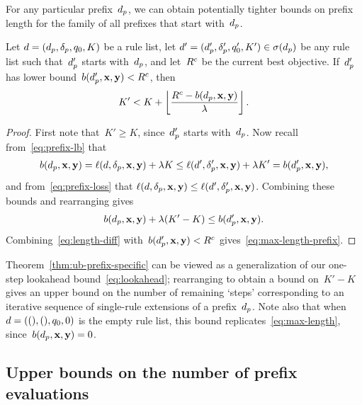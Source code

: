 For any particular prefix~$d_p$, we can obtain potentially tighter bounds on
prefix length for the family of all prefixes that start with~$d_p$.

\begin{theorem}
\label{thm:ub-prefix-specific}
Let ${{d} = (d_p, \delta_p, q_0, K)}$ be a rule list, let
${{d}' = (d_p', \delta_p', q_0', K') \in \sigma(d_p)}$
be any rule list such that~$d_p'$ starts with~$d_p$,
and let~${R^c}$ be the current best objective.
%
If~$d_p'$ has lower bound~${b(d_p', \mathbf{x}, \mathbf{y}) < {R^c}}$, then
\begin{align}
K' < K + \left\lfloor \frac{\CurrentObj - b(\Prefix, \x, \y)}{\Reg} \right\rfloor.
\label{eq:max-length-prefix}
\end{align}
\end{theorem}

\begin{proof}
First note that~${K' \ge K}$, since~$d_p'$ starts with~$d_p$.
%
Now recall from~\eqref{eq:prefix-lb} that
%
\begin{align}
b(\Prefix, \x, \y) = \Loss(\RL, \Labels, \x, \y) + \Reg K
\le \Loss(\RL', \Labels', \x, \y) + \Reg K' = b(\Prefix', \x, \y),
\end{align}
%
and from~\eqref{eq:prefix-loss} that
${\ell({d}, \delta_p, \mathbf{x}, \mathbf{y}) \le \ell({d}', \delta_p', \mathbf{x}, \mathbf{y})}$.
%
Combining these bounds and rearranging gives
\begin{align}
b(\Prefix, \x, \y) + \Reg (K' - K) \le b(\Prefix', \x, \y).
\label{eq:length-diff}
\end{align}
Combining~\eqref{eq:length-diff} with~${b(d_p', \mathbf{x}, \mathbf{y}) < {R^c}}$
gives~\eqref{eq:max-length-prefix}.
\end{proof}

Theorem~\ref{thm:ub-prefix-specific} can be viewed as a generalization
of our one-step lookahead bound~\eqref{eq:lookahead};
rearranging to obtain a bound on~${K' - K}$
gives an upper bound on the number of remaining `steps' corresponding
to an iterative sequence of single-rule extensions of a prefix~$d_p$.
%
Note also that when~${{d} = ((), (), q_0, 0)}$ is the empty rule list,
this bound replicates~\eqref{eq:max-length}, since~${b(d_p, \mathbf{x}, \mathbf{y}) = 0}$.

\subsection{Upper bounds on the number of prefix evaluations}
\label{sec:ub-size}

